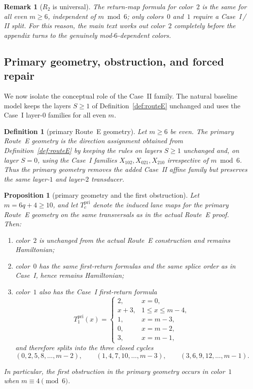 \documentclass[11pt]{article}
\newtheorem{proposition}{Proposition}
\newtheorem{definition}{Definition}
\newtheorem{remark}{Remark}
\begin{document}
\begin{remark}[$R_2$ is universal]\label{rem:R2-universal}
The return-map formula for color~$2$ is the same for all even $m\ge 6$, independent of $m\bmod 6$; only colors~$0$ and~$1$ require a Case~I\,/\,II split.
For this reason, the main text works out color~$2$ completely before the appendix turns to the genuinely mod-$6$-dependent colors.
\end{remark}

\subsection{Primary geometry, obstruction, and forced repair}\label{sec:primary-obstruction}

We now isolate the conceptual role of the Case~II family.
The natural baseline model keeps the layers $S\ge 1$ of Definition~\ref{def:routeE} unchanged and uses the Case~I layer-$0$ families for all even $m$.

\begin{definition}[primary Route~E geometry]\label{def:routeE-primary}
Let $m\ge 6$ be even.
The \emph{primary Route~E geometry} is the direction assignment obtained from Definition~\ref{def:routeE} by keeping the rules on layers $S\ge 1$ unchanged and, on layer $S=0$, using the Case~I families $X_{102},X_{021},X_{210}$ irrespective of $m\bmod 6$.
Thus the primary geometry removes the added Case~II affine family but preserves the same layer-$1$ and layer-$2$ transducer.
\end{definition}

\begin{proposition}[primary geometry and the first obstruction]\label{prop:primary-geometry-obstruction}
Let $m=6q+4\ge 10$, and let $T_c^{\mathrm{pri}}$ denote the induced lane maps for the primary Route~E geometry on the same transversals as in the actual Route~E proof.
Then:
\begin{enumerate}[label=\textup{(\roman*)},leftmargin=2.5em]
\item color~$2$ is unchanged from the actual Route~E construction and remains Hamiltonian;
\item color~$0$ has the same first-return formulas and the same splice order as in Case~I, hence remains Hamiltonian;
\item color~$1$ also has the Case~I first-return formula
\[
T_1^{\mathrm{pri}}(x)=
\begin{cases}
2,&x=0,\\
x+3,&1\le x\le m-4,\\
1,&x=m-3,\\
0,&x=m-2,\\
3,&x=m-1,
\end{cases}
\]
and therefore splits into the three closed cycles
\[
(0,2,5,8,\dots,m-2),
\qquad
(1,4,7,10,\dots,m-3),
\qquad
(3,6,9,12,\dots,m-1).
\]
\end{enumerate}
In particular, the first obstruction in the primary geometry occurs in color~$1$ when $m\equiv 4\pmod 6$.
\end{proposition}
\end{document}
